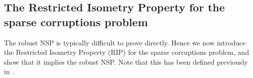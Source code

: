 \documentclass[10.5pt]{article}
\newcommand{\annote}[1]{{\leavevmode\color{RoyalBlue}{#1}}}
\begin{document}
{%
}


\subsection{The Restricted Isometry Property for the sparse corruptions problem}\label{sec:rip}


The robust NSP is typically difficult to prove directly.  Hence we now introduce the Restricted Isometry Property (RIP) for the sparse corruptions problem, and show that it implies the robust NSP.  Note that this has been defined previously in \cite[Defn.\ 2.1]{LiCorruptionsConstrApprox}.

\end{document}
